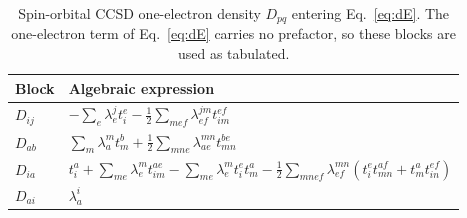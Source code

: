 \documentclass[12pt]{article}
\begin{document}
\begin{table}[H]
\caption{Spin-orbital CCSD one-electron density $D_{pq}$ entering Eq.~\eqref{eq:dE}.  The one-electron term of Eq.~\eqref{eq:dE} carries no prefactor, so these blocks are used as tabulated.}
\label{Table:ccsd_1pdm}
\renewcommand{\arraystretch}{1.6}
\begin{center}
\begin{tabular}{ll}
\hline\hline
Block & Algebraic expression \\
\hline
$D_{ij}$ & $\displaystyle -\sum_e \lambda^j_e t_i^e - \frac12 \sum_{mef}\lambda^{jm}_{ef} t_{im}^{ef}$ \\
$D_{ab}$ & $\displaystyle \sum_m \lambda^m_a t_m^b + \frac12 \sum_{mne}\lambda^{mn}_{ae} t_{mn}^{be}$ \\
$D_{ia}$ & $\displaystyle t_i^a + \sum_{me}\lambda^m_e t_{im}^{ae} - \sum_{me}\lambda^m_e t_i^e t_m^a - \frac12\sum_{mnef}\lambda^{mn}_{ef}\left(t_i^e t_{mn}^{af} + t_m^a t_{in}^{ef}\right)$ \\
$D_{ai}$ & $\displaystyle \lambda^i_a$ \\
\hline\hline
\end{tabular}
\end{center}
\end{table}
\end{document}
